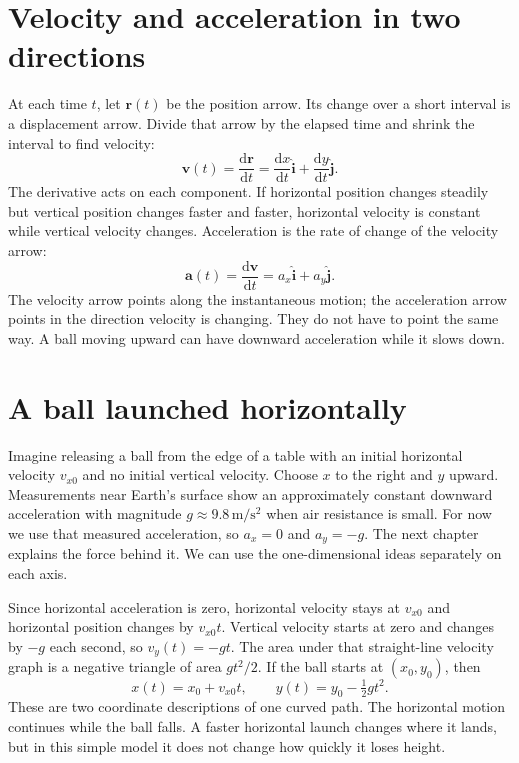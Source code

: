 \documentclass[11pt,oneside]{book}
\newcommand{\dd}{\mathrm{d}}
\newcommand{\vect}[1]{\boldsymbol{#1}}
\newcommand{\od}[2]{\frac{\dd #1}{\dd #2}}
\theoremstyle{reviewstyle}
\begin{document}
\section{Velocity and acceleration in two directions}
At each time $t$, let $\vect r(t)$ be the position arrow. Its change over a short interval is a displacement arrow. Divide that arrow by the elapsed time and shrink the interval to find velocity:
\begin{equation}
\vect v(t)=\od{\vect r}{t}
=\od{x}{t}\hat{\vect i}+\od{y}{t}\hat{\vect j}.
\end{equation}
The derivative acts on each component. If horizontal position changes steadily but vertical position changes faster and faster, horizontal velocity is constant while vertical velocity changes. Acceleration is the rate of change of the velocity arrow:
\begin{equation}
\vect a(t)=\od{\vect v}{t}
=a_x\hat{\vect i}+a_y\hat{\vect j}.
\end{equation}
The velocity arrow points along the instantaneous motion; the acceleration arrow points in the direction velocity is changing. They do not have to point the same way. A ball moving upward can have downward acceleration while it slows down.

\section{A ball launched horizontally}
Imagine releasing a ball from the edge of a table with an initial horizontal velocity $v_{x0}$ and no initial vertical velocity. Choose $x$ to the right and $y$ upward. Measurements near Earth's surface show an approximately constant downward acceleration with magnitude $g\approx9.8\,\mathrm{m/s^2}$ when air resistance is small. For now we use that measured acceleration, so $a_x=0$ and $a_y=-g$. The next chapter explains the force behind it. We can use the one-dimensional ideas separately on each axis.

Since horizontal acceleration is zero, horizontal velocity stays at $v_{x0}$ and horizontal position changes by $v_{x0}t$. Vertical velocity starts at zero and changes by $-g$ each second, so $v_y(t)=-gt$. The area under that straight-line velocity graph is a negative triangle of area $gt^2/2$. If the ball starts at $(x_0,y_0)$, then
\begin{equation}
x(t)=x_0+v_{x0}t,\qquad
y(t)=y_0-\tfrac12gt^2.
\end{equation}
These are two coordinate descriptions of one curved path. The horizontal motion continues while the ball falls. A faster horizontal launch changes where it lands, but in this simple model it does not change how quickly it loses height.
\end{document}

